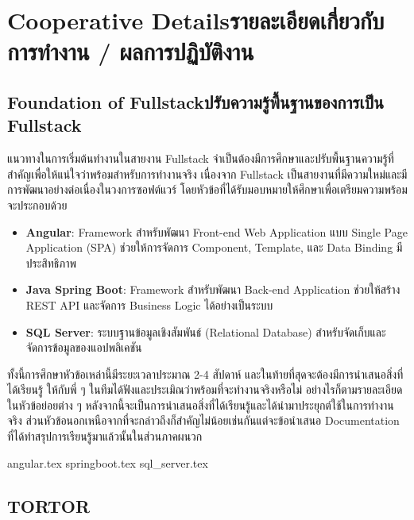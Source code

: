 

\setcounter{secnumdepth}{3}

\chapter{\ifenglish Cooperative Details\else รายละเอียดเกี่ยวกับการทำงาน / ผลการปฏิบัติงาน \fi}

\section{\ifenglish Foundation of Fullstack\else ปรับความรู้พื้นฐานของการเป็น Fullstack\fi}
แนวทางในการเริ่มต้นทำงานในสายงาน Fullstack จำเป็นต้องมีการศึกษาและปรับพื้นฐานความรู้ที่สำคัญเพื่อให้แน่ใจว่าพร้อมสำหรับการทำงานจริง  
เนื่องจาก Fullstack เป็นสายงานที่มีความใหม่และมีการพัฒนาอย่างต่อเนื่องในวงการซอฟต์แวร์ โดยหัวข้อที่ได้รับมอบหมายให้ศึกษาเพื่อเตรียมความพร้อมจะประกอบด้วย

\begin{itemize}
    \item \textbf{Angular}: Framework สำหรับพัฒนา Front-end Web Application แบบ Single Page Application (SPA) ช่วยให้การจัดการ Component, Template, และ Data Binding มีประสิทธิภาพ
    \item \textbf{Java Spring Boot}: Framework สำหรับพัฒนา Back-end Application ช่วยให้สร้าง REST API และจัดการ Business Logic ได้อย่างเป็นระบบ
    \item \textbf{SQL Server}: ระบบฐานข้อมูลเชิงสัมพันธ์ (Relational Database) สำหรับจัดเก็บและจัดการข้อมูลของแอปพลิเคชัน
\end{itemize}

ทั้งนี้การศึกษาหัวข้อเหล่านี้มีระยะเวลาประมาณ 2-4 สัปดาห์ และในท้ายที่สุดจะต้องมีการนำเสนอสิ่งที่ได้เรียนรู้
ให้กับพี่ ๆ ในทีมได้ฟังและประเมิณว่าพร้อมที่จะทำงานจริงหรือไม่ อย่างไรก็ตามรายละเอียดในหัวข้อย่อยต่าง ๆ หลังจากนี้จะเป็นการนำเสนอสิ่งที่ได้เรียนรู้และได้นำมาประยุกต์ใช้ในการทำงานจริง
ส่วนหัวข้อนอกเหนือจากที่จะกล่าวถึงก็สำคัญไม่น้อยเช่นกันแต่จะข้อนำเสนอ Documentation ที่ได้ทำสรุปการเรียนรู้มาแล้วนั้นในส่วนภาคผนวก

\clearpage
{angular.tex}
\clearpage
{springboot.tex}
\clearpage
{sql_server.tex}
\clearpage

\section{\ifenglish TOR\else TOR\fi}

